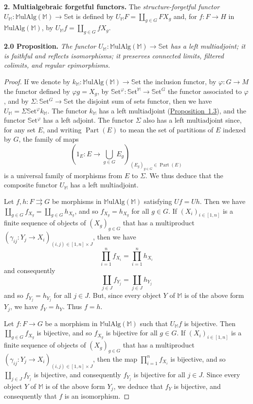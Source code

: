 \documentclass{article}
\newenvironment{itenv}[1]
  {\phantomsection\par\medskip\noindent\textbf{#1.}\itshape}
  {\medskip}
\newenvironment{rmenv}[1]
  {\phantomsection\par\medskip\noindent\textbf{#1.}\rmfamily}
  {\medskip}
\newcommand{\bb}[1]{{\mathbb{#1}}}
\newcommand{\Set}{\mathbb{S}\mathrm{et}}
\newcommand{\MulAlg}{\mathbb{M}\mathrm{ulAlg}}
\DeclareMathOperator{\Part}{Part}
\newcommand{\oldpage}[1]{\marginpar{\footnotesize$\Big\vert$ \textit{p.~#1}}}
\begin{document}
\begin{rmenv}{2. Multialgebraic forgetful functors}
  The \emph{structure-forgetful functor} $U_\bb{M}\colon\MulAlg(\bb{M})\to\Set$ is defined by $U_\bb{M}F=\coprod_{g\in G}FX_g$ and, for $f\colon F\to H$ in $\MulAlg(\bb{M})$, by $U_\bb{M}f=\coprod_{g\in G}fX_g$.
\end{rmenv}

\begin{itenv}{2.0 Proposition}
  The functor $U_\bb{M}\colon\MulAlg(\bb{M})\to\Set$ has a left multiadjoint;
  it is faithful and reflects isomorphisms;
  it preserves connected limits, filtered colimits, and regular epimorphisms.
\end{itenv}

\begin{proof}
  If we denote by $k_\bb{M}\colon\MulAlg(\bb{M})\to\Set$ the inclusion functor, by $\varphi\colon G\to M$ the functor defined by $\varphi g=X_g$, by $\Set^\varphi\colon\Set^\bb{M}\to\Set^G$ the functor associated to $\varphi$, and by $\Sigma\colon\Set^G\to\Set$ the disjoint sum of sets functor, then we have $U_\bb{M}=\Sigma\Set^\varphi k_\bb{M}$.
  The functor $k_\bb{M}$ has a left multiadjoint (\hyperref[proposition-1.3]{Proposition~1.3}), and the functor $\Set^\varphi$ has a left adjoint.
  The functor $\Sigma$ also has a left multiadjoint since, for any set $E$, and writing $\Part(E)$ to mean the set of partitions of $E$ indexed by $G$, the family of maps
  \[
    \left(1_E\colon E\to\bigcup_{g\in G}E_g\right)_{(E_g)_{g\in G}\in\Part(E)}
  \]
  is a universal family of morphisms from $E$ to $\Sigma$.
  We thus deduce that the composite functor $U_\bb{M}$ has a left multiadjoint.

  Let $f,h\colon F\rightrightarrows G$ be morphisms in $\MulAlg(\bb{M})$ satisfying $Uf=Uh$.
  Then we have $\coprod_{g\in G}f_{X_g}=\coprod_{g\in G}h_{X_g}$, and so $f_{X_g}=h_{X_g}$ for all $g\in G$.
  If $(X_i)_{i\in[1,n]}$ is a finite sequence of objects of $(X_g)_{g\in G}$ that has a multiproduct $(\gamma_{ij}\colon Y_j\to X_i)_{(i,j)\in[1,n]\times J}$, then we have
  \[
    \prod_{i=1}^n f_{X_i} = \prod_{i=1}^n h_{X_i}
  \]
  and consequently
  \[
    \coprod_{j\in J} f_{Y_j} = \coprod_{j\in J} h_{Y_j}
  \]
  and so $f_{Y_j}=h_{Y_j}$ for all $j\in J$.
  But, since every object $Y$ of $\bb{M}$ is of the above form $Y_j$, we have $f_Y=h_Y$.
  Thus $f=h$.

\oldpage{200}
  Let $f\colon F\to G$ be a morphism in $\MulAlg(\bb{M})$ such that $U_\bb{M}f$ is bijective.
  Then $\coprod_{g\in G}f_{X_g}$ is bijective, and so $f_{X_g}$ is bijective for all $g\in G$.
  If $(X_i)_{i\in[1,n]}$ is a finite sequence of objects of $(X_g)_{g\in G}$ that has a multiproduct $(\gamma_{ij}\colon Y_j\to X_i)_{(i,j)\in[1,n]\times J}$, then the map $\prod_{i=1}^nf_{X_i}$ is bijective, and so $\coprod_{j\in J}f_{Y_j}$ is bijective, and consequently $f_{Y_j}$ is bijective for all $j\in J$.
  Since every object $Y$ of $\bb{M}$ is of the above form $Y_j$, we deduce that $f_Y$ is bijective, and consequently that $f$ is an isomorphism.


\end{proof}
\end{document}
